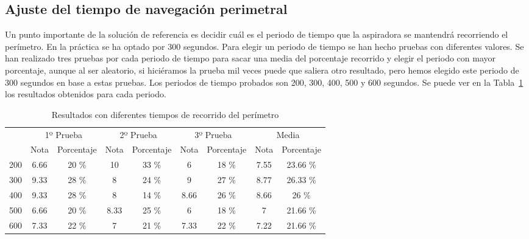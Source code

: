 \subsection{Ajuste del tiempo de navegación perimetral}
Un punto importante de la solución de referencia es decidir cuál es el periodo de tiempo que la aspiradora se mantendrá recorriendo el perímetro. En la práctica se ha optado por 300 segundos. Para elegir un periodo de tiempo se han hecho pruebas con diferentes valores. Se han realizado tres pruebas por cada periodo de tiempo para sacar una media del porcentaje recorrido y elegir el periodo con mayor porcentaje, aunque al ser aleatorio, si hiciéramos la prueba mil veces puede que saliera otro resultado, pero hemos elegido este periodo de 300 segundos en base a estas pruebas. Los periodos de tiempo probados son 200, 300, 400, 500 y 600 segundos. Se puede ver en la Tabla~\ref{resultados_roomba} los resultados obtenidos para cada periodo.\\


\begin{table}[H]
\centering
\caption{Resultados con diferentes tiempos de recorrido del perímetro}
\label{resultados_roomba}
\begin{tabular}{c|c|c|c|c|c|c|c|c|}
\cline{2-9}
                          & \multicolumn{2}{c|}{1º Prueba} & \multicolumn{2}{c|}{2º Prueba} & \multicolumn{2}{c|}{3º Prueba} & \multicolumn{2}{c|}{Media} \\ \cline{2-9} 
                          & Nota        & Porcentaje       & Nota        & Porcentaje       & Nota        & Porcentaje       & Nota      & Porcentaje     \\ \hline
\multicolumn{1}{|c|}{200} & 6.66        & 20 \%            & 10          & 33 \%            & 6           & 18 \%            & 7.55      & 23.66 \%       \\ \hline
\multicolumn{1}{|c|}{300} & 9.33        & 28 \%            & 8           & 24 \%            & 9           & 27 \%            & 8.77      & 26.33 \%       \\ \hline
\multicolumn{1}{|c|}{400} & 9.33        & 28 \%            & 8           & 14 \%            & 8.66        & 26 \%            & 8.66      & 26 \%          \\ \hline
\multicolumn{1}{|c|}{500} & 6.66        & 20 \%            & 8.33        & 25 \%            & 6           & 18 \%            & 7         & 21.66 \%       \\ \hline
\multicolumn{1}{|c|}{600} & 7.33        & 22 \%            & 7           & 21 \%            & 7.33        & 22 \%            & 7.22      & 21.66 \%       \\ \hline
\end{tabular}
\end{table}

